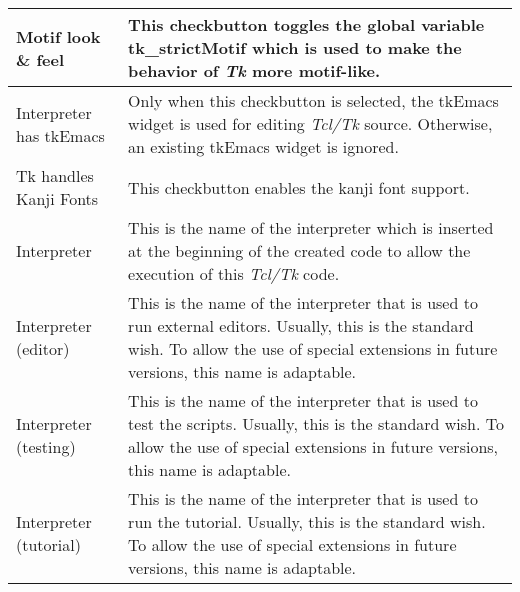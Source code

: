 {\newpage
\clearpage
\samepage \begin{supertabular}{|l|p{6.8cm}|}
Motif look \& feel       & This checkbutton toggles the
                          global variable tk\_strict\-Motif
                          which is used to make the behavior
                          of {\em Tk }
 more motif-like.\\  \hline
Interpreter has tkEmacs & Only when this checkbutton is
                          selected, the tkEmacs widget is
                          used for editing {\em Tcl/Tk }
 source.
                          Otherwise, an existing tkEmacs
                          widget is ignored.\\  \hline
Tk handles Kanji Fonts  & This checkbutton enables the kanji
                          font support.\\  \hline
Interpreter             & This is the name of the
                          interpreter which is inserted at
                          the beginning of the created code
                          to allow the execution of this
                          {\em Tcl/Tk }
 code.\\  \hline
Interpreter (editor)    & This is the name of the
                          interpreter that is used to run
                          external editors. Usually, this is
                          the standard wish. To allow the
                          use of special extensions in future
                          versions, this name is adaptable.\\  \hline
Interpreter (testing)   & This is the name of the
                          interpreter that is used to test
                          the scripts. Usually, this is the
                          standard wish. To allow the use of
                          special extensions in future
                          versions, this name is adaptable.\\  \hline
Interpreter (tutorial)  & This is the name of the
                          interpreter that is used to run
                          the tutorial. Usually, this is the
                          standard wish. To allow the use of
                          special extensions in future
                          versions, this name is adaptable.\\  \hline
\end{supertabular}
}

{\newpage
\clearpage
\samepage \begin{figure}[hbt]
  \centerline{
  \epsfysize=12.5cm
  }

  \label{fig:The procedure XFProcOptionsPathFile}
\end{figure}
}

